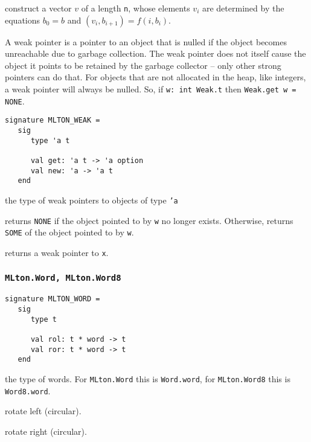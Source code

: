 \begin{description}

construct a vector $v$ of a length {\tt n}, whose elements $v_i$ are determined
by the equations $b_0 = b$ and $(v_i, b_{i+1}) = f (i, b_i)$.

\end{description}

A weak pointer is a pointer to an object that is nulled if the
object becomes unreachable due to garbage collection.  The weak
pointer does not itself cause the object it points to be retained by
the garbage collector -- only other strong pointers can do that.
For objects that are not allocated in the heap, like integers, a weak
pointer will always be nulled.  So, if {\tt w: int Weak.t} then
{\tt Weak.get w = NONE}.
\begin{verbatim}
signature MLTON_WEAK =
   sig
      type 'a t

      val get: 'a t -> 'a option
      val new: 'a -> 'a t
   end
\end{verbatim}

\begin{description}
the type of weak pointers to objects of type {\tt 'a}

returns {\tt NONE} if the object pointed to by {\tt w} no longer
exists.  Otherwise, returns {\tt SOME} of the object pointed to by
{\tt w}.

returns a weak pointer to {\tt x}.
\end{description}
%
\subsubsection{\tt MLton.Word, MLton.Word8}

\begin{verbatim}
signature MLTON_WORD =
   sig
      type t
         
      val rol: t * word -> t
      val ror: t * word -> t
   end
\end{verbatim}

\begin{description}
the type of words.  For {\tt MLton.Word} this is {\tt Word.word}, for
{\tt MLton.Word8} this is {\tt Word8.word}.

rotate left (circular).

rotate right (circular).
\end{description}

